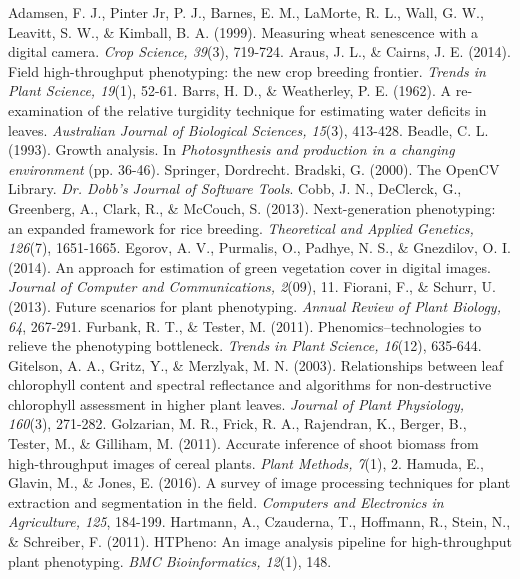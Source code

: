 \documentclass[12pt, a4paper]{article}
\begin{document}
	\begin{thebibliography}{99}
		 Adamsen, F. J., Pinter Jr, P. J., Barnes, E. M., LaMorte, R. L., Wall, G. W., Leavitt, S. W., \& Kimball, B. A. (1999). Measuring wheat senescence with a digital camera. \textit{Crop Science, 39}(3), 719-724.
		 Araus, J. L., \& Cairns, J. E. (2014). Field high-throughput phenotyping: the new crop breeding frontier. \textit{Trends in Plant Science, 19}(1), 52-61.
		 Barrs, H. D., \& Weatherley, P. E. (1962). A re-examination of the relative turgidity technique for estimating water deficits in leaves. \textit{Australian Journal of Biological Sciences, 15}(3), 413-428.
		 Beadle, C. L. (1993). Growth analysis. In \textit{Photosynthesis and production in a changing environment} (pp. 36-46). Springer, Dordrecht.
		 Bradski, G. (2000). The OpenCV Library. \textit{Dr. Dobb's Journal of Software Tools}.
		 Cobb, J. N., DeClerck, G., Greenberg, A., Clark, R., \& McCouch, S. (2013). Next-generation phenotyping: an expanded framework for rice breeding. \textit{Theoretical and Applied Genetics, 126}(7), 1651-1665.
		 Egorov, A. V., Purmalis, O., Padhye, N. S., \& Gnezdilov, O. I. (2014). An approach for estimation of green vegetation cover in digital images. \textit{Journal of Computer and Communications, 2}(09), 11.
		 Fiorani, F., \& Schurr, U. (2013). Future scenarios for plant phenotyping. \textit{Annual Review of Plant Biology, 64}, 267-291.
		 Furbank, R. T., \& Tester, M. (2011). Phenomics–technologies to relieve the phenotyping bottleneck. \textit{Trends in Plant Science, 16}(12), 635-644.
		 Gitelson, A. A., Gritz, Y., \& Merzlyak, M. N. (2003). Relationships between leaf chlorophyll content and spectral reflectance and algorithms for non-destructive chlorophyll assessment in higher plant leaves. \textit{Journal of Plant Physiology, 160}(3), 271-282.
		 Golzarian, M. R., Frick, R. A., Rajendran, K., Berger, B., Tester, M., \& Gilliham, M. (2011). Accurate inference of shoot biomass from high-throughput images of cereal plants. \textit{Plant Methods, 7}(1), 2.
		 Hamuda, E., Glavin, M., \& Jones, E. (2016). A survey of image processing techniques for plant extraction and segmentation in the field. \textit{Computers and Electronics in Agriculture, 125}, 184-199.
		 Hartmann, A., Czauderna, T., Hoffmann, R., Stein, N., \& Schreiber, F. (2011). HTPheno: An image analysis pipeline for high-throughput plant phenotyping. \textit{BMC Bioinformatics, 12}(1), 148.

\end{thebibliography}
\end{document}
